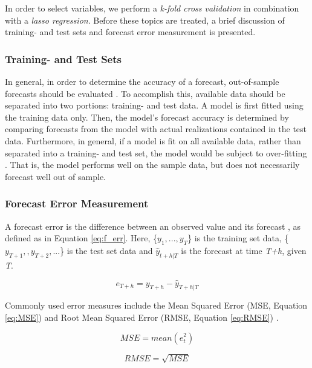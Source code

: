 In order to select variables, we perform a \textit{k-fold cross validation} in combination with a \textit{lasso regression}. Before these topics are treated, a brief discussion of training- and test sets and forecast error measurement is presented.


\subsubsection{Training- and Test Sets}
In general, in order to determine the accuracy of a forecast, out-of-sample forecasts should be evaluated \citep{Hyndman}. To accomplish this, available data should be separated into two portions: training- and test data. A model is first fitted using the training data only. Then, the model's forecast accuracy is determined by comparing forecasts from the model with actual realizations contained in the test data. Furthermore, in general, if a model is fit on all available data, rather than separated into a training- and test set, the model would be subject to over-fitting \citep{Hyndman}. That is, the model performs well on the sample data, but does not necessarily forecast well out of sample.

\subsubsection{Forecast Error Measurement}
A forecast error is the difference between an observed value and its forecast \citep{Hyndman}, as defined as in Equation \ref{eq:f_err}. Here, \{$ y_{1},...,y_{T} $\} is the training set data, \{$ y_{T+1},,y_{T+2},...$\} is the test set data and $\hat{y}_{t+h|T}$ is the forecast at time \textit{T+h}, given \textit{T}. 

\begin{equation}\label{eq:f_err}
    e_{T+h} = y_{T+h} - \hat{y}_{T+h|T}
\end{equation}

Commonly used error measures include the Mean Squared Error (MSE, Equation \ref{eq:MSE}) and Root Mean Squared Error (RMSE, Equation \ref{eq:RMSE}) \citep{Hyndman}.

\begin{equation}\label{eq:MSE}
    MSE = mean(e_t^2)
\end{equation}

\begin{equation}\label{eq:RMSE}
    RMSE = \sqrt{MSE}
\end{equation}


